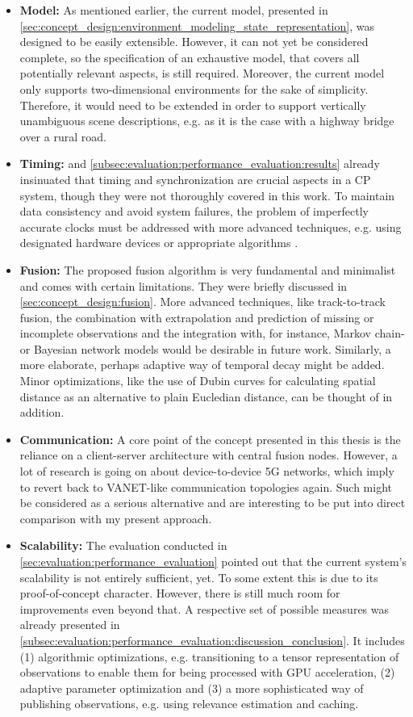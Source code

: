 \begin{itemize}
	\item \textbf{Model:} As mentioned earlier, the current model, presented in \cref{sec:concept_design:environment_modeling_state_representation}, was designed to be easily extensible. However, it can not yet be considered complete, so the specification of an exhaustive model, that covers all potentially relevant aspects, is still required. Moreover, the current model only supports two-dimensional environments for the sake of simplicity. Therefore, it would need to be extended in order to support vertically unambiguous scene descriptions, e.g. as it is the case with a highway bridge over a rural road. 
	\item \textbf{Timing:}  and \cref{subsec:evaluation:performance_evaluation:results} already insinuated that timing and synchronization are crucial aspects in a CP system, though they were not thoroughly covered in this work. To maintain data consistency and avoid system failures, the problem of imperfectly accurate clocks must be addressed with more advanced techniques, e.g. using designated hardware devices \cite{Rauch2011} or appropriate algorithms \cite{Julier}. 
	\item \textbf{Fusion:} The proposed fusion algorithm is very fundamental and minimalist and comes with certain limitations. They were briefly discussed in \cref{sec:concept_design:fusion}. More advanced techniques, like track-to-track fusion, the combination with extrapolation and prediction of missing or incomplete observations and the integration with, for instance, Markov chain- or Bayesian network models would be desirable in future work. Similarly, a more elaborate, perhaps adaptive way of temporal decay might be added. Minor optimizations, like the use of Dubin curves for calculating spatial distance as an alternative to plain Eucledian distance, can be thought of in addition. 
	\item \textbf{Communication:} A core point of the concept presented in this thesis is the reliance on a client-server architecture with central fusion nodes. However, a lot of research is going on about device-to-device 5G networks, which imply to revert back to VANET-like communication topologies again. Such might be considered as a serious alternative and are interesting to be put into direct comparison with my present approach. 
	\item \textbf{Scalability:} The evaluation conducted in \cref{sec:evaluation:performance_evaluation} pointed out that the current system's scalability is not entirely sufficient, yet. To some extent this is due to its proof-of-concept character. However, there is still much room for improvements even beyond that. A respective set of possible measures was already presented in \cref{subsec:evaluation:performance_evaluation:discussion_conclusion}. It includes (1) algorithmic optimizations, e.g. transitioning to a tensor representation of observations \cite{Petrich2018} to enable them for being processed with GPU acceleration, (2) adaptive parameter optimization and (3) a more sophisticated way of publishing observations, e.g. using relevance estimation \cite{Breu2013} and caching. 

\end{itemize}
